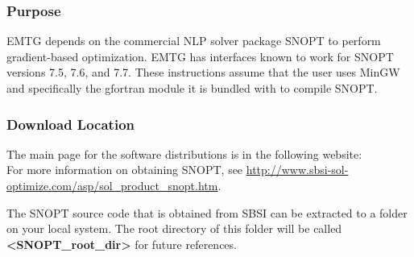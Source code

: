 
\subsubsection{Purpose}
\noindent \ac{EMTG} depends on the commercial \ac{NLP} solver package \ac{SNOPT} to perform gradient-based optimization. \ac{EMTG} has interfaces known to work for \ac{SNOPT} versions 7.5, 7.6, and 7.7. These instructions assume that the user uses MinGW and specifically the gfortran module it is bundled with to compile \ac{SNOPT}.

\subsubsection{Download Location}
\noindent The main page for the software distributions is in the following website: \\
For more information on obtaining \ac{SNOPT}, see \url{http://www.sbsi-sol-optimize.com/asp/sol_product_snopt.htm}.

\noindent The \ac{SNOPT} source code that is obtained from \ac{SBSI} can be extracted to a folder on your local system. The root directory of this folder will be called \textbf{\textless SNOPT\_root\_dir\textgreater} for future references.
